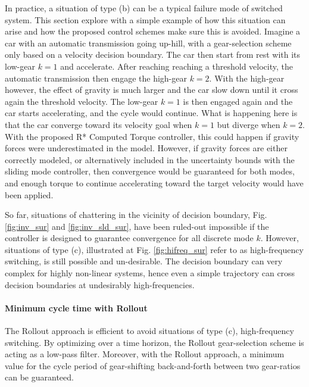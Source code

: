 In practice, a situation of type (b) can be a typical failure mode of switched system. This section explore with a simple example of how this situation can arise and how the proposed control schemes make sure this is avoided. Imagine a car with an automatic transmission going up-hill, with a gear-selection scheme only based on a velocity decision boundary. The car then start from rest with its low-gear $k=1$ and accelerate. After reaching reaching a threshold velocity, the automatic transmission then engage the high-gear $k=2$. With the high-gear however, the effect of gravity is much larger and the car slow down until it cross again the threshold velocity. The low-gear $k=1$ is then engaged again and the car starts accelerating, and the cycle would continue. What is happening here is that the car converge toward its velocity goal when $k=1$ but diverge when $k=2$. With the proposed R* Computed Torque controller, this could happen if gravity forces were underestimated in the model. However, if gravity forces are either correctly modeled, or alternatively included in the uncertainty bounds with the sliding mode controller, then convergence would be guaranteed for both modes, and enough torque to continue accelerating toward the target velocity would have been applied. %

So far, situations of chattering in the vicinity of decision boundary, Fig. \ref{fig:inv_sur} and \ref{fig:inv_sld_sur}, have been ruled-out impossible if the controller is designed to guarantee convergence for all discrete mode $k$. However, situations of type (c), illustrated at Fig. \ref{fig:hifreq_sur} refer to as high-frequency switching, is still possible and un-desirable. The decision boundary can very complex for highly non-linear systems, hence even a simple trajectory can cross decision boundaries at undesirably high-frequencies. 

\paragraph{Minimum cycle time with Rollout}

The Rollout approach is efficient to avoid situations of type (c), high-frequency switching. By optimizing over a time horizon, the Rollout gear-selection scheme is acting as a low-pass filter. Moreover, with the Rollout approach, a minimum value for the cycle period of gear-shifting back-and-forth between two gear-ratios can be guaranteed. 

